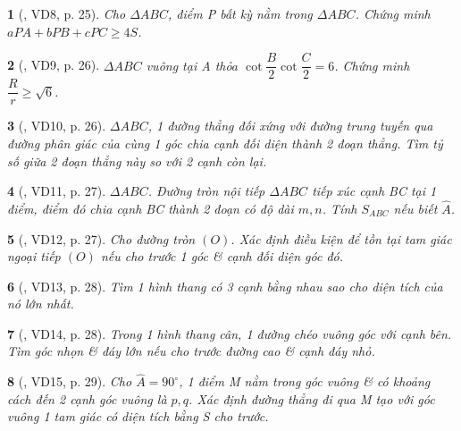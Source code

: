 \documentclass{article}
\newtheorem{baitoan}{}
\begin{document}
\begin{baitoan}[\cite{Hai_Hung_Thu_Tung2022_tap_1}, VD8, p. 25]
	Cho $\Delta ABC$, điểm P bất kỳ nằm trong $\Delta ABC$. Chứng minh $aPA + bPB + cPC\ge4S$.
\end{baitoan}

\begin{baitoan}[\cite{Hai_Hung_Thu_Tung2022_tap_1}, VD9, p. 26]
	$\Delta ABC$ vuông tại A thỏa $\cot\dfrac{B}{2}\cot\dfrac{C}{2} = 6$. Chứng minh $\dfrac{R}{r}\ge\sqrt{6}$.
\end{baitoan}

\begin{baitoan}[\cite{Hai_Hung_Thu_Tung2022_tap_1}, VD10, p. 26]
	$\Delta ABC$, 1 đường thẳng đối xứng với đường trung tuyến qua đường phân giác của cùng 1 góc chia cạnh đối diện thành 2 đoạn thẳng. Tìm tỷ số giữa 2 đoạn thẳng này so với 2 cạnh còn lại.
\end{baitoan}

\begin{baitoan}[\cite{Hai_Hung_Thu_Tung2022_tap_1}, VD11, p. 27]
	$\Delta ABC$. Đường tròn nội tiếp $\Delta ABC$ tiếp xúc cạnh BC tại 1 điểm, điểm đó chia cạnh BC thành 2 đoạn có độ dài $m,n$. Tính $S_{ABC}$ nếu biết $\widehat{A}$.
\end{baitoan}

\begin{baitoan}[\cite{Hai_Hung_Thu_Tung2022_tap_1}, VD12, p. 27]
	Cho đường tròn $(O)$. Xác định điều kiện để tồn tại tam giác ngoại tiếp $(O)$ nếu cho trước 1 góc \& cạnh đối diện góc đó.
\end{baitoan}

\begin{baitoan}[\cite{Hai_Hung_Thu_Tung2022_tap_1}, VD13, p. 28]
	Tìm 1 hình thang có 3 cạnh bằng nhau sao cho diện tích của nó lớn nhất.
\end{baitoan}

\begin{baitoan}[\cite{Hai_Hung_Thu_Tung2022_tap_1}, VD14, p. 28]
	Trong 1 hình thang cân, 1 đường chéo vuông góc với cạnh bên. Tìm góc nhọn \& đáy lớn nếu cho trước đường cao \& cạnh đáy nhỏ.
\end{baitoan}

\begin{baitoan}[\cite{Hai_Hung_Thu_Tung2022_tap_1}, VD15, p. 29]
	Cho $\widehat{A} = 90^\circ$, 1 điểm M nằm trong góc vuông \& có khoảng cách đến 2 cạnh góc vuông là $p,q$. Xác định đường thẳng đi qua M tạo với góc vuông 1 tam giác có diện tích bằng S cho trước.
\end{baitoan}
\end{document}
